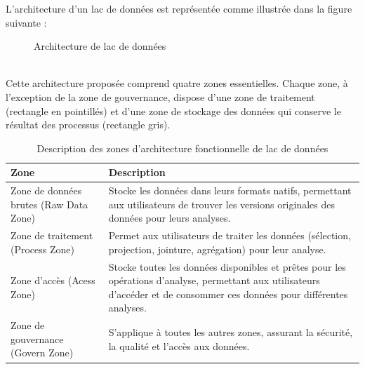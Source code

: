 \documentclass{report}
\begin{document}
L'architecture d'un lac de données est représentée comme illustrée dans la figure suivante :
\begin{figure}[h]
        \centering
        \caption{Architecture de lac de données \cite{Franck Ravat et Yan ZhaoData,2019}}
        \label{f}
    \end{figure} 
    \\
Cette architecture proposée comprend quatre zones essentielles. Chaque zone, à l'exception de la zone de gouvernance, dispose d'une zone de traitement (rectangle en pointillés) et d'une zone de stockage des données qui conserve le résultat des processus (rectangle gris).

\begin{table}[htbp]
\centering

\begin{tabular}{|p{4cm}|p{}|}
\hline
\textbf{Zone}             & \textbf{Description} \\
\hline
Zone de données brutes (Raw Data Zone) & Stocke les données dans leurs formats natifs, permettant aux utilisateurs de trouver les versions originales des données pour leurs analyses. \\
\hline
Zone de traitement (Process Zone)& Permet aux utilisateurs de traiter les données (sélection, projection, jointure, agrégation) pour leur analyse. \\
\hline
Zone d'accès  (Acess Zone) & Stocke toutes les données disponibles et prêtes pour les opérations d'analyse, permettant aux utilisateurs d'accéder et de consommer ces données pour différentes analyses. \\
\hline
Zone de gouvernance  (Govern Zone) & S'applique à toutes les autres zones, assurant la sécurité, la qualité et l'accès aux données. \\
\hline
\end{tabular}
\caption{Description des zones d’architecture fonctionnelle de lac de données}
\end{table}
\newpage
\end{document}
